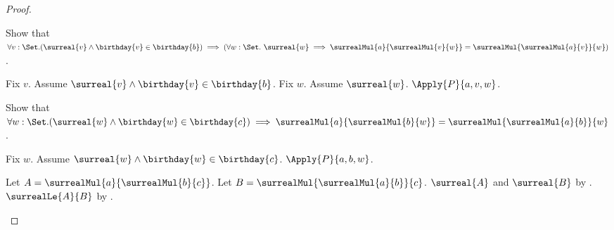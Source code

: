\begin{proof}
\begin{subproof}
\begin{subproof}
        \end{subproof}
        Show that $\forall v:\Set.
            (\surreal{v}\land\birthday{v}\in\birthday{b})
            \implies
            (\forall w:\Set.\ \surreal{w}\implies
                \surrealMul{a}{\surrealMul{v}{w}}
                    =\surrealMul{\surrealMul{a}{v}}{w})$.
        \begin{subproof}
            Fix $v$.
            Assume $\surreal{v}\land\birthday{v}\in\birthday{b}$.
            Fix $w$.
            Assume $\surreal{w}$.
            $\Apply{P}{a,v,w}$.
        \end{subproof}
        Show that $\forall w:\Set.
            (\surreal{w}\land\birthday{w}\in\birthday{c})
            \implies
            \surrealMul{a}{\surrealMul{b}{w}}
                =\surrealMul{\surrealMul{a}{b}}{w}$.
        \begin{subproof}
            Fix $w$.
            Assume $\surreal{w}\land\birthday{w}\in\birthday{c}$.
            $\Apply{P}{a,b,w}$.
        \end{subproof}
        Let $A=\surrealMul{a}{\surrealMul{b}{c}}$.
        Let $B=\surrealMul{\surrealMul{a}{b}}{c}$.
        $\surreal{A}$ and $\surreal{B}$
            by .
        $\surrealLe{A}{B}$
            by .


\end{subproof}
\end{proof}
